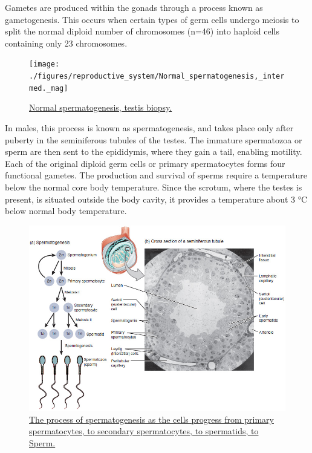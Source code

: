 Gametes are produced within the gonads through a process known as gametogenesis. This occurs when certain types of germ cells undergo meiosis to split the normal diploid number of chromosomes (n=46) into haploid cells containing only 23 chromosomes.



\begin{figure}

{\centering \texttt{[image: ./figures/reproductive\_system/Normal\_spermatogenesis,\_intermed.\_mag]} 

}

\caption{\href{https://commons.wikimedia.org/wiki/File:Normal_spermatogenesis,_intermed._mag.jpg}{Normal spermatogenesis, testis biopsy.}}\label{fig:testesbiopsy}
\end{figure}

In males, this process is known as spermatogenesis, and takes place only after puberty in the seminiferous tubules of the testes. The immature spermatozoa or sperm are then sent to the epididymis, where they gain a tail, enabling motility. Each of the original diploid germ cells or primary spermatocytes forms four functional gametes. The production and survival of sperms require a temperature below the normal core body temperature. Since the scrotum, where the testes is present, is situated outside the body cavity, it provides a temperature about 3 °C below normal body temperature.



\begin{figure}

{\centering \includegraphics[width=0.7\linewidth]{./figures/reproductive_system/Figure_28_01_04} 

}

\caption{\href{https://commons.wikimedia.org/wiki/File:Figure_28_01_04.jpg}{The process of spermatogenesis as the cells progress from primary spermatocytes, to secondary spermatocytes, to spermatids, to Sperm.}}\label{fig:spermatogenesis}
\end{figure}

